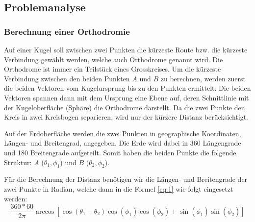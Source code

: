\subsection{Problemanalyse}
\subsubsection{Berechnung einer Orthodromie}
Auf einer Kugel soll zwischen zwei Punkten die kürzeste Route bzw. die kürzeste
Verbindung gewählt werden, welche auch Orthodrome\cite{orthodrome} genannt wird. Die Orthodrome
ist immer ein Teilstück eines Grosskreises. Um die kürzeste Verbindung
zwischen den beiden Punkten $A$ und $B$ zu berechnen, werden zuerst die beiden
Vektoren vom Kugelursprung bis zu den Punkten ermittelt. Die beiden Vektoren
spannen dann mit dem Ursprung eine Ebene auf, deren Schnittlinie mit der
Kugeloberfläche (Sphäre) die Orthodrome darstellt. Da die zwei Punkte den Kreis
in zwei Kreisbogen separieren, wird nur der kürzere Distanz berücksichtigt.


Auf der Erdoberfläche werden die zwei Punkten in geographische Koordinaten,
Längen- und Breitengrad\cite{laengenbreitengrade}, angegeben. Die Erde wird dabei in 360 Längengrade und
180 Breitengrade aufgeteilt. Somit haben die beiden Punkte die folgende
Struktur: $A$ (\(\theta_1 , \phi_1\)) und $B$ (\(\theta_2 , \phi_2\)).

Für die Berechnung der Distanz benötigen wir die Längen- und Breitengrade der
zwei Punkte in Radian, welche dann in die Formel \eqref{eq:1} wie folgt
eingesetzt werden: \\
\begin{equation}
\label{eq:1}
 \frac{360*60}{2 \pi} \arccos[\cos(\theta_1 - \theta_2) \cos(\phi_1) \cos(\phi_2)+\sin(\phi_1) \sin(\phi_2)]
 \end{equation}




